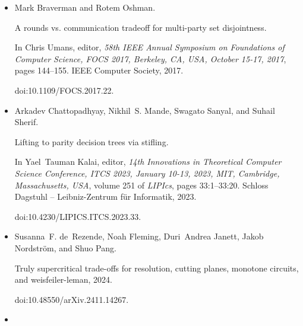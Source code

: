 \begin{itemize}
Exponential Separation Between Powers of Regular and General
Resolution over Parities.


In Rahul Santhanam, editor, \emph{39th Computational Complexity
Conference (CCC 2024)}, volume 300 of \emph{Leibniz International Proceedings
in Informatics (LIPIcs)}, pages 23:1–23:32, Dagstuhl, Germany, 2024. Schloss
Dagstuhl – Leibniz-Zentrum für Informatik.


doi:10.4230/LIPIcs.CCC.2024.23.





\item[] 
[10]

Mark Braverman and Rotem Oshman.


A rounds vs. communication tradeoff for multi-party set disjointness.


In Chris Umans, editor, \emph{58th IEEE Annual Symposium on
Foundations of Computer Science, FOCS 2017, Berkeley, CA, USA, October
15-17, 2017}, pages 144–155. IEEE Computer Society, 2017.


doi:10.1109/FOCS.2017.22.





\item[] 
[11]

Arkadev Chattopadhyay, Nikhil S. Mande, Swagato Sanyal, and Suhail Sherif.


Lifting to parity decision trees via stifling.


In Yael Tauman Kalai, editor, \emph{14th Innovations in Theoretical
Computer Science Conference, ITCS 2023, January 10-13, 2023, MIT,
Cambridge, Massachusetts, USA}, volume 251 of \emph{LIPIcs}, pages
33:1–33:20. Schloss Dagstuhl – Leibniz-Zentrum für Informatik, 2023.


doi:10.4230/LIPICS.ITCS.2023.33.





\item[] 
[12]

Susanna F. de Rezende, Noah Fleming, Duri Andrea Janett, Jakob Nordström, and
Shuo Pang.


Truly supercritical trade-offs for resolution, cutting planes,
monotone circuits, and weisfeiler-leman, 2024.


doi:10.48550/arXiv.2411.14267.





\item[] 
[13]


\end{itemize}
